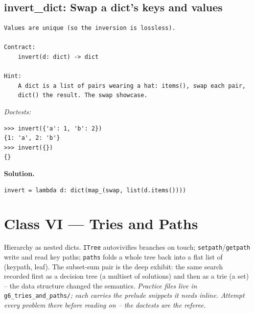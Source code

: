 \documentclass[11pt,letterpaper]{book}
\begin{document}
\section{invert\_dict: Swap a dict's keys and values}
\begin{lstlisting}[style=spec]
Values are unique (so the inversion is lossless).

Contract:
    invert(d: dict) -> dict

Hint:
    A dict is a list of pairs wearing a hat: items(), swap each pair,
    dict() the result. The swap showcase.
\end{lstlisting}
\noindent\textit{Doctests:}
\begin{lstlisting}[style=spec]
>>> invert({'a': 1, 'b': 2})
{1: 'a', 2: 'b'}
>>> invert({})
{}
\end{lstlisting}
\noindent\textbf{Solution.}
\begin{lstlisting}[style=code]
invert = lambda d: dict(map_(swap, list(d.items())))
\end{lstlisting}
\chapter{Class VI --- Tries and Paths}

Hierarchy as nested dicts. \texttt{ITree} autovivifies branches on touch;
\texttt{setpath}/\texttt{getpath} write and read key paths; \texttt{paths}
folds a whole tree back into a flat list of (keypath, leaf). The subset-sum
pair is the deep exhibit: the same search recorded first as a decision tree
(a multiset of solutions) and then as a trie (a set) -- the data structure
changed the semantics.
\medskip\noindent\textit{Practice files live in }\texttt{g6\_tries\_and\_paths/}\textit{;
each carries the prelude snippets it needs inline. Attempt every problem there
before reading on -- the doctests are the referee.}
\end{document}
